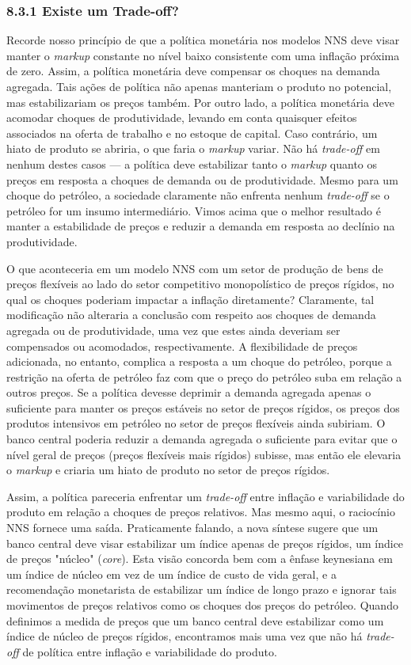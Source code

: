 \documentclass[12pt]{article}
\begin{document}
\subsubsection{8.3.1 Existe um Trade-off?} Recorde nosso princípio de que a política monetária nos modelos NNS deve visar manter o \textit{markup} constante no nível baixo consistente com uma inflação próxima de zero. Assim, a política monetária deve compensar os choques na demanda agregada. Tais ações de política não apenas manteriam o produto no potencial, mas estabilizariam os preços também. Por outro lado, a política monetária deve acomodar choques de produtividade, levando em conta quaisquer efeitos associados na oferta de trabalho e no estoque de capital. Caso contrário, um hiato de produto se abriria, o que faria o \textit{markup} variar. Não há \textit{trade-off} em nenhum destes casos — a política deve estabilizar tanto o \textit{markup} quanto os preços em resposta a choques de demanda ou de produtividade. Mesmo para um choque do petróleo, a sociedade claramente não enfrenta nenhum \textit{trade-off} se o petróleo for um insumo intermediário. Vimos acima que o melhor resultado é manter a estabilidade de preços e reduzir a demanda em resposta ao declínio na produtividade.

O que aconteceria em um modelo NNS com um setor de produção de bens de preços flexíveis ao lado do setor competitivo monopolístico de preços rígidos, no qual os choques poderiam impactar a inflação diretamente? Claramente, tal modificação não alteraria a conclusão com respeito aos choques de demanda agregada ou de produtividade, uma vez que estes ainda deveriam ser compensados ou acomodados, respectivamente. A flexibilidade de preços adicionada, no entanto, complica a resposta a um choque do petróleo, porque a restrição na oferta de petróleo faz com que o preço do petróleo suba em relação a outros preços. Se a política devesse deprimir a demanda agregada apenas o suficiente para manter os preços estáveis no setor de preços rígidos, os preços dos produtos intensivos em petróleo no setor de preços flexíveis ainda subiriam. O banco central poderia reduzir a demanda agregada o suficiente para evitar que o nível geral de preços (preços flexíveis mais rígidos) subisse, mas então ele elevaria o \textit{markup} e criaria um hiato de produto no setor de preços rígidos.

Assim, a política pareceria enfrentar um \textit{trade-off} entre inflação e variabilidade do produto em relação a choques de preços relativos. Mas mesmo aqui, o raciocínio NNS fornece uma saída. Praticamente falando, a nova síntese sugere que um banco central deve visar estabilizar um índice apenas de preços rígidos, um índice de preços "núcleo" (\textit{core}). Esta visão concorda bem com a ênfase keynesiana em um índice de núcleo em vez de um índice de custo de vida geral, e a recomendação monetarista de estabilizar um índice de longo prazo e ignorar tais movimentos de preços relativos como os choques dos preços do petróleo. Quando definimos a medida de preços que um banco central deve estabilizar como um índice de núcleo de preços rígidos, encontramos mais uma vez que não há \textit{trade-off} de política entre inflação e variabilidade do produto.
\end{document}
